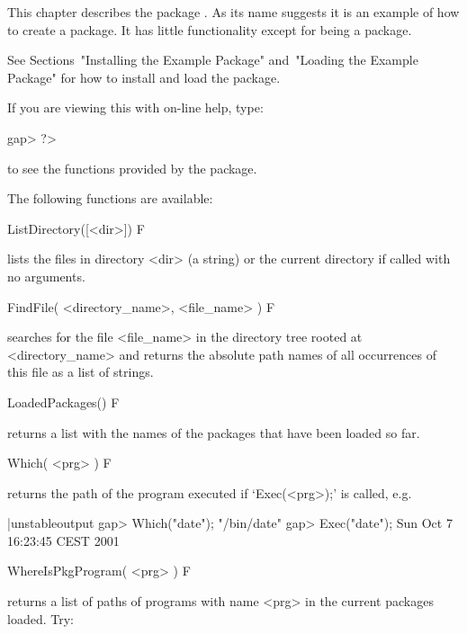 

This chapter  describes  the  {\GAP}  package  {\Example}.  As  its  name
suggests it is an example of how to  create  a  {\GAP}  package.  It  has
little functionality except for being a package.

See Sections~"Installing the Example Package"  and~"Loading  the  Example
Package" for how to install and load the {\Example} package.

If you are viewing this with on-line help, type: 

\beginexample
gap> ?>
\endexample

to see the functions provided by the {\Example} package.


The following functions are available:

\>ListDirectory([<dir>]) F

lists the files in directory <dir> (a string) or the current directory if
called with no arguments.

\>FindFile( <directory_name>, <file_name> ) F

searches  for the  file   <file_name> in  the  directory  tree  rooted at
<directory_name> and returns the absolute path names of  all  occurrences
of this file as a list of strings.

\>LoadedPackages() F

returns a list with the names of the packages that have  been  loaded  so
far.

\>Which( <prg> ) F

returns the path of the program executed if `Exec(<prg>);' is called, e.g.

\beginexample|unstableoutput
gap> Which("date");         
"/bin/date"
gap> Exec("date");
Sun Oct  7 16:23:45 CEST 2001
\endexample

\>WhereIsPkgProgram( <prg> ) F

returns a list of paths of  programs  with  name  <prg>  in  the  current
packages loaded. Try:

